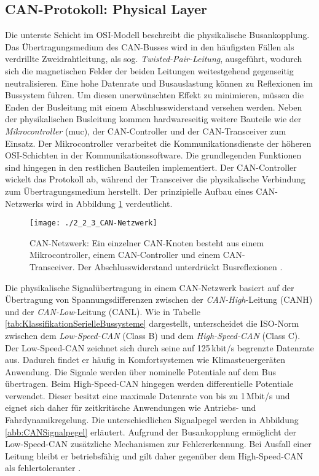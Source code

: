 \subsection{CAN-Protokoll: Physical Layer} \label{subsec:PhysicalLayer}
Die unterste Schicht im \acs{OSI}-Modell beschreibt die physikalische Busankopplung. Das Übertragungsmedium des \acs{CAN}-Busses wird in den häufigsten Fällen als verdrillte Zweidrahtleitung, als sog. \emph{Twisted-Pair-Leitung}, ausgeführt, wodurch sich die magnetischen Felder der beiden Leitungen weitestgehend gegenseitig neutralisieren. Eine hohe Datenrate und Busauslastung können zu Reflexionen im Bussystem führen. Um diesen unerwünschten Effekt zu minimieren, müssen die Enden der Busleitung mit einem Abschlusswiderstand versehen werden. Neben der physikalischen Busleitung kommen hardwareseitig weitere Bauteile wie der \emph{Mikrocontroller} (\acs{muc}), der \acs{CAN}-Controller und der \acs{CAN}-Transceiver zum Einsatz. Der Mikrocontroller verarbeitet die Kommunikationsdienste der höheren \acs{OSI}-Schichten in der Kommunikationssoftware. Die grundlegenden Funktionen sind hingegen in den restlichen Bauteilen implementiert. Der \acs{CAN}-Controller wickelt das Protokoll ab, während der Transceiver die physikalische Verbindung zum Übertragungsmedium herstellt. Der prinzipielle Aufbau eines \acs{CAN}-Netzwerks wird in Abbildung \ref{abb:CANNetzwerk} verdeutlicht.

\begin{figure}[!htbp]
	\centering
	\texttt{[image: ./2\_2\_3\_CAN-Netzwerk]}
	\caption{CAN-Netzwerk: Ein einzelner \acs{CAN}-Knoten besteht aus einem Mikrocontroller, einem \acs{CAN}-Controller und einem \acs{CAN}-Transceiver. Der Abschlusswiderstand unterdrückt	Busreflexionen \cite{Zimmermann.2014}.}
	\label{abb:CANNetzwerk}
\end{figure}

Die physikalische Signalübertragung in einem \acs{CAN}-Netzwerk basiert auf der Übertragung von Spannungsdifferenzen zwischen der \emph{\acs{CAN}-High}-Leitung (CANH) und der \emph{\acs{CAN}-Low}-Leitung (CANL). Wie in Tabelle \ref{tab:KlassifikationSerielleBussysteme} dargestellt, unterscheidet die \acs{ISO}-Norm zwischen dem \emph{Low-Speed-\acs{CAN}} (Class B) und dem \emph{High-Speed-\acs{CAN}} (Class C). Der Low-Speed-\acs{CAN} zeichnet sich durch seine auf 125\,kbit/s begrenzte Datenrate aus. Dadurch findet er häufig in Komfortsystemen wie Klimasteuergeräten Anwendung. Die Signale werden über nominelle Potentiale auf dem Bus übertragen. Beim High-Speed-\acs{CAN} hingegen werden differentielle Potentiale verwendet. Dieser besitzt eine maximale Datenrate von bis zu 1\,Mbit/s und eignet sich daher für zeitkritische Anwendungen wie Antriebs- und Fahrdynamikregelung. Die unterschiedlichen Signalpegel werden in Abbildung \ref{abb:CANSignalpegel} erläutert. Aufgrund der Busankopplung ermöglicht der Low-Speed-\acs{CAN} zusätzliche Mechanismen zur Fehlererkennung. Bei Ausfall einer Leitung bleibt er betriebsfähig und gilt daher gegenüber dem High-Speed-\acs{CAN} als fehlertoleranter \cite{Zimmermann.2014, VectorInformatikGmbH.}.

